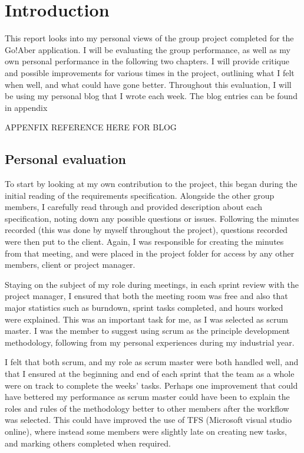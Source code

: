 \chapter{Introduction}
This report looks into my personal views of the group project completed for the Go!Aber application. I will be evaluating the group performance, as well as my own personal performance in the following two chapters. I will provide critique and possible improvements for various times in the project, outlining what I felt when well, and what could have gone better.  Throughout this evaluation, I will be using my personal blog that I wrote each week. The blog entries can be found in appendix \par
APPENFIX REFERENCE HERE FOR BLOG
\section{Personal evaluation}
To start by looking at my own contribution to the project, this began during the initial reading of the requirements specification. Alongside the other group members, I carefully read through and provided description about each specification, noting down any possible questions or issues. Following the minutes recorded (this was done by myself throughout the project), questions recorded were then put to the client. Again, I was responsible for creating the minutes from that meeting, and were placed in the project folder for access by any other members, client or project manager.\par
Staying on the subject of my role during meetings, in each sprint review with the project manager, I ensured that both the meeting room was free and also that major statistics such as burndown, sprint tasks completed, and hours worked were explained. This was an important task for me, as I was selected as scrum master. I was the member to suggest using scrum as the principle development methodology, following from my personal experiences during my industrial year. \par
I felt that both scrum, and my role as scrum master were both handled well, and that I ensured at the beginning and end of each sprint that the team as a whole were on track to complete the weeks’ tasks. Perhaps one improvement that could have bettered my performance as scrum master could have been to explain the roles and rules of the methodology better to other members after the workflow was selected. This could have improved the use of TFS (Microsoft visual studio online), where instead some members were slightly late on creating new tasks, and marking others completed when required.\par
